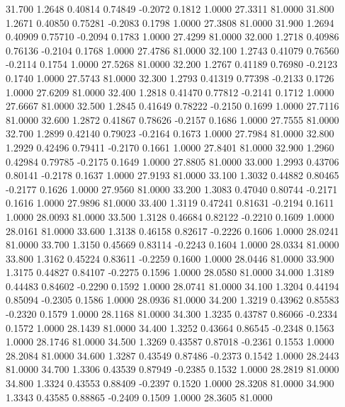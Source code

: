   31.700   1.2648   0.40814   0.74849  -0.2072   0.1812   1.0000  27.3311  81.0000
  31.800   1.2671   0.40850   0.75281  -0.2083   0.1798   1.0000  27.3808  81.0000
  31.900   1.2694   0.40909   0.75710  -0.2094   0.1783   1.0000  27.4299  81.0000
  32.000   1.2718   0.40986   0.76136  -0.2104   0.1768   1.0000  27.4786  81.0000
  32.100   1.2743   0.41079   0.76560  -0.2114   0.1754   1.0000  27.5268  81.0000
  32.200   1.2767   0.41189   0.76980  -0.2123   0.1740   1.0000  27.5743  81.0000
  32.300   1.2793   0.41319   0.77398  -0.2133   0.1726   1.0000  27.6209  81.0000
  32.400   1.2818   0.41470   0.77812  -0.2141   0.1712   1.0000  27.6667  81.0000
  32.500   1.2845   0.41649   0.78222  -0.2150   0.1699   1.0000  27.7116  81.0000
  32.600   1.2872   0.41867   0.78626  -0.2157   0.1686   1.0000  27.7555  81.0000
  32.700   1.2899   0.42140   0.79023  -0.2164   0.1673   1.0000  27.7984  81.0000
  32.800   1.2929   0.42496   0.79411  -0.2170   0.1661   1.0000  27.8401  81.0000
  32.900   1.2960   0.42984   0.79785  -0.2175   0.1649   1.0000  27.8805  81.0000
  33.000   1.2993   0.43706   0.80141  -0.2178   0.1637   1.0000  27.9193  81.0000
  33.100   1.3032   0.44882   0.80465  -0.2177   0.1626   1.0000  27.9560  81.0000
  33.200   1.3083   0.47040   0.80744  -0.2171   0.1616   1.0000  27.9896  81.0000
  33.400   1.3119   0.47241   0.81631  -0.2194   0.1611   1.0000  28.0093  81.0000
  33.500   1.3128   0.46684   0.82122  -0.2210   0.1609   1.0000  28.0161  81.0000
  33.600   1.3138   0.46158   0.82617  -0.2226   0.1606   1.0000  28.0241  81.0000
  33.700   1.3150   0.45669   0.83114  -0.2243   0.1604   1.0000  28.0334  81.0000
  33.800   1.3162   0.45224   0.83611  -0.2259   0.1600   1.0000  28.0446  81.0000
  33.900   1.3175   0.44827   0.84107  -0.2275   0.1596   1.0000  28.0580  81.0000
  34.000   1.3189   0.44483   0.84602  -0.2290   0.1592   1.0000  28.0741  81.0000
  34.100   1.3204   0.44194   0.85094  -0.2305   0.1586   1.0000  28.0936  81.0000
  34.200   1.3219   0.43962   0.85583  -0.2320   0.1579   1.0000  28.1168  81.0000
  34.300   1.3235   0.43787   0.86066  -0.2334   0.1572   1.0000  28.1439  81.0000
  34.400   1.3252   0.43664   0.86545  -0.2348   0.1563   1.0000  28.1746  81.0000
  34.500   1.3269   0.43587   0.87018  -0.2361   0.1553   1.0000  28.2084  81.0000
  34.600   1.3287   0.43549   0.87486  -0.2373   0.1542   1.0000  28.2443  81.0000
  34.700   1.3306   0.43539   0.87949  -0.2385   0.1532   1.0000  28.2819  81.0000
  34.800   1.3324   0.43553   0.88409  -0.2397   0.1520   1.0000  28.3208  81.0000
  34.900   1.3343   0.43585   0.88865  -0.2409   0.1509   1.0000  28.3605  81.0000
